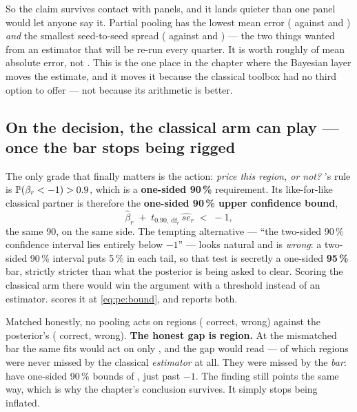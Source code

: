 So the claim survives contact with \nbThreeNseed{} panels, and it lands quieter than one panel
would let anyone say it. Partial pooling has the lowest mean error (\nbThreeMaePartial{} against
\nbThreeMaeNopool{} and \nbThreeMaeComplete) \emph{and} the smallest seed-to-seed spread
(\nbThreeMaePartialSd{} against \nbThreeMaeNopoolSd{} and \nbThreeMaeCompleteSd) --- the two things
wanted from an estimator that will be re-run every quarter. It is worth roughly
\pc{\nbThreeGainMean} of mean absolute error, not \pc{\nbThreeGainOne}. This is the one place in
the chapter where the Bayesian layer moves the estimate, and it moves it because the classical
toolbox had no third option to offer --- not because its arithmetic is better.

\subsection*{On the decision, the classical arm can play --- once the bar stops being rigged}

The only grade that finally matters is the action: \emph{price this region, or not?}
's rule is $\operatorname{\mathbb{P}}(\beta_r < -1) > 0.9$, which is a \textbf{one-sided 90\,\%}
requirement. Its like-for-like classical partner is therefore the \textbf{one-sided 90\,\% upper
confidence bound},
%
\begin{equation}
  \hat\beta_r \;+\; t_{0.90,\ \mathrm{df}_r}\, \widehat{se}_r \;<\; -1 ,
  \label{eq:pe:bound}
\end{equation}
%
the same 90, on the same side. The tempting alternative --- ``the two-sided 90\,\% confidence
interval lies entirely below $-1$'' --- looks natural and is \emph{wrong}: a two-sided 90\,\%
interval puts 5\,\% in each tail, so that test is secretly a one-sided \textbf{95\,\%} bar,
strictly stricter than what the posterior is being asked to clear. Scoring the classical arm there
would win the argument with a threshold instead of an estimator.  scores it at
\cref{eq:pe:bound}, and reports both.



Matched honestly, no pooling acts on \nbThreeActNp{} regions (\nbThreeActNpCorrect{} correct,
\nbThreeActNpWrong{} wrong) against the posterior's \nbThreeActPp{} (\nbThreeActPpCorrect{}
correct, \nbThreeActPpWrong{} wrong). \textbf{The honest gap is \nbThreeGapHonest{} region.} At the
mismatched bar the same fits would act on only \nbThreeActNpStrict, and the gap would read
\nbThreeGapMismatched{} --- of which \nbThreeNFlip{} regions were never missed by the classical
\emph{estimator} at all. They were missed by the \emph{bar}: \nbThreeFlipRegions{} have one-sided
90\,\% bounds of \nbThreeFlipBounds, just past $-1$. The finding still points the same way, which is
why the chapter's conclusion survives. It simply stops being inflated.

